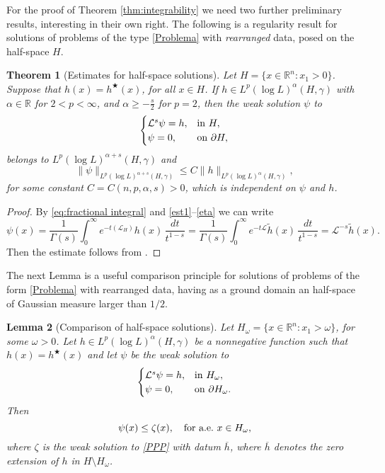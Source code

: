 \documentclass[a4paper,10pt,reqno]{amsart}
\newcommand{\R}{\mathbb{R}}
\newtheorem{theorem}{Theorem}[section]
\newtheorem{lemma}[theorem]{Lemma}
\numberwithin{equation}{section}
\begin{document}
For the proof of Theorem \ref{thm:integrability} we need two further preliminary results, interesting in their own right. The following is a regularity
result for solutions of problems of the type \eqref{Problema} with \emph{rearranged} data, posed on the half-space $H$.

\begin{theorem}[Estimates for half-space solutions]\label{Regularity theorem}
Let $H=\{x\in\R^n:x_{1}>0\}$. Suppose that $h(x)=h^{\bigstar}(x)$, for all $x\in H$.
If $h\in L^{p}(\log L)^\alpha(H,\gamma)$ with $\alpha\in\R$ for $2<p<\infty$, and $\alpha\geq-\frac{s}{2}$ for $p=2$,
then the weak solution $\psi$ to
\begin{equation}\label{PPP}
\begin{cases}
\mathcal{L}^s\psi=h,&\hbox{in}~H,\\
\psi=0,&\hbox{on}~\partial H,
\end{cases}
\end{equation}
belongs to $L^{p}(\log L)^{\alpha+s}(H,\gamma)$ and
$$\|\psi\|_{L^{p}(\log L)^{\alpha+s}(H,\gamma)}\leq C\|h\|_{L^{p}(\log L)^\alpha(H,\gamma)},$$
for some constant $C=C(n,p,\alpha,s)>0$, which is independent on $\psi$ and $h$.
\end{theorem}

\begin{proof}
By \eqref{eq:fractional integral} and \eqref{est1}--\eqref{eta} we can write
$$\psi(x)=\frac{1}{\Gamma(s)}\int_0^\infty e^{-t(\mathcal{L}_H)}h(x)\,\frac{dt}{t^{1-s}}=
\frac{1}{\Gamma(s)}\int_0^\infty e^{-t\mathcal{L}}\widetilde{h}(x)\,\frac{dt}{t^{1-s}}=\mathcal{L}^{-s}\widetilde{h}(x).$$
Then the estimate follows from \cite[Theorem~5.7]{KM}.
\end{proof}

The next Lemma is a useful comparison principle for solutions of problems of the form \eqref{Problema} with rearranged data, having as a ground domain an
half-space of Gaussian measure larger than $1/2$.

\begin{lemma}[Comparison of half-space solutions]\label{semispazi}
Let $H_{\omega}=\{x\in\mathbf{\mathbb{R}}^{n}:x_{1}>\omega\}$, for some $\omega>0$.
Let $h\in L^{p}(\log L)^\alpha(H,\gamma)$ be a nonnegative function such that $h(x)=h^{\bigstar}(x)$ and let $\psi$ be the weak
solution to
$$\begin{cases}
\mathcal{L}^{s}\psi=h,& \hbox{in}~H_{\omega},\\
\psi=0,&\hbox{on}~\partial H_{\omega}.
\end{cases}$$
Then
$$\psi(x) \leq \zeta(x), \quad\hbox{for a.e.}~x\in H_{\omega},$$
where $\zeta$ is the weak solution to \eqref{PPP} with datum $\overline{h}$,
where $\overline{h}$ denotes the zero extension of $h$ in $H\setminus H_{\omega}$.
\end{lemma}
\end{document}
